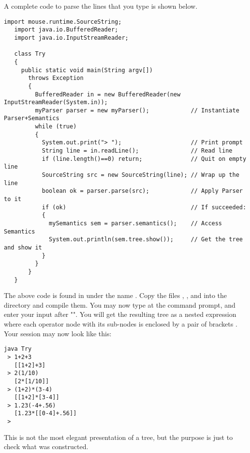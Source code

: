 \medskip
A complete code to parse the lines that you type is shown below.

\small
\begin{Verbatim}[frame=single,framesep=2mm,samepage=true,xleftmargin=6mm,xrightmargin=6mm,baselinestretch=0.8]
   import mouse.runtime.SourceString;
   import java.io.BufferedReader;
   import java.io.InputStreamReader;

   class Try
   {
     public static void main(String argv[])
       throws Exception
       {
         BufferedReader in = new BufferedReader(new InputStreamReader(System.in));
         myParser parser = new myParser();            // Instantiate Parser+Semantics
         while (true)
         {
           System.out.print("> ");                    // Print prompt
           String line = in.readLine();               // Read line
           if (line.length()==0) return;              // Quit on empty line
           SourceString src = new SourceString(line); // Wrap up the line
           boolean ok = parser.parse(src);            // Apply Parser to it
           if (ok)                                    // If succeeded:
           {
             mySemantics sem = parser.semantics();    // Access Semantics
             System.out.println(sem.tree.show());     // Get the tree and show it
           }
         }
       }
   }
\end{Verbatim}
\normalsize

\medskip
The above code is found in 
under the name .
Copy the files ,
, and  
into the  directory and compile them.
You may now type  at the command prompt, and enter your
input after "\tx{>}".
You will get the resulting tree as a nested expression
where each operator node with its sub-nodes is enclosed by a pair of brackets \tx{[ ]}.
Your session may now look like this:

\small
\begin{Verbatim}[samepage=true,xleftmargin=15mm,baselinestretch=0.8]
 java Try
 > 1+2+3
   [[1+2]+3]
 > 2(1/10)
   [2*[1/10]]
 > (1+2)*(3-4)
   [[1+2]*[3-4]]
 > 1.23(-4+.56)
   [1.23*[[0-4]+.56]]
 >
\end{Verbatim}
\normalsize

This is not the most elegant presentation of a tree,
but the purpose is just to check what was constructed.

